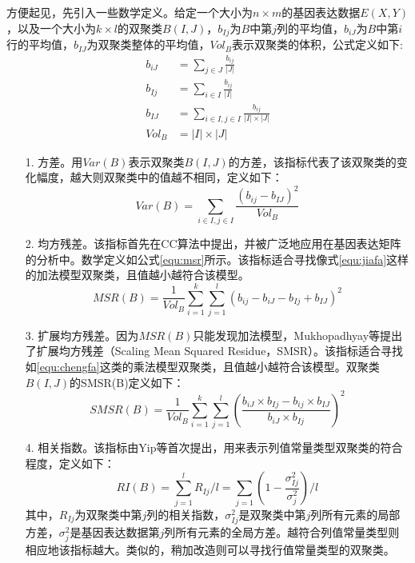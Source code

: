   方便起见，先引入一些数学定义。给定一个大小为$n\times m$的基因表达数据$E(X,Y)$，以及一个大小为$k\times l$的双聚类$B(I,J)$，$b_{Ij}$为$B$中第$j$列的平均值，$b_{iJ}$为$B$中第$i$行的平均值，$b_{IJ}$为双聚类整体的平均值，$Vol_B$表示双聚类的体积，公式定义如下:
  \begin{align}
    b_{iJ} &= \sum_{j\in J}\frac{b_{ij}}{|J|} \\
    b_{Ij} &= \sum_{i\in I}\frac{b_{ij}}{|I|} \\
    b_{IJ} &= \sum_{i\in I,j\in I}\frac{ b_{ij} }{|I| \times |J|}\\
    Vol_B &= |I| \times |J|
  \end{align}
  \begin{enumerate}
    \item[1.] 方差。用$Var(B)$表示双聚类$B(I,J)$的方差，该指标代表了该双聚类的变化幅度，越大则双聚类中的值越不相同，定义如下：
    \begin{equation}
      Var(B) = \sum_{i\in I,j\in I}\frac{(b_{ij}-b_{IJ})^2}{Vol_B}
    \end{equation}

    \item[2.] 均方残差。该指标首先在CC\cite{cc}算法中提出，并被广泛地应用在基因表达矩阵的分析中。数学定义如公式\ref{equ:msr}所示。该指标适合寻找像式\ref{equ:jiafa}这样的加法模型双聚类，且值越小越符合该模型。
    \begin{equation}\label{equ:msr}
      MSR(B) = \frac{1}{Vol_B}\sum_{i=1}^k\sum_{j=1}^l(b_{ij}-b_{iJ}-b_{Ij}+b_{IJ})^2
    \end{equation}

    \item[3.] 扩展均方残差。因为$MSR(B)$只能发现加法模型，Mukhopadhyay\cite{mukhopadhyay2010biclustering}等提出了扩展均方残差（Scaling Mean Squared Residue，SMSR）。该指标适合寻找如\ref{equ:chengfa}这类的乘法模型双聚类，且值越小越符合该模型。双聚类$B(I,J)$的SMSR(B)定义如下：
    \begin{equation}\label{equ:smsr}
      SMSR(B) = \frac{1}{Vol_B}\sum_{i=1}^k\sum_{j=1}^l(\frac{b_{iJ}\times b_{Ij}-b_{ij}\times b_{IJ}}{b_{iJ}\times b_{Ij}})^2
    \end{equation}

    \item[4.] 相关指数。该指标由Yip\cite{yip2004harp}等首次提出，用来表示列值常量类型双聚类的符合程度，定义如下：
    \begin{equation}
      RI(B) = \sum_{j=1}^l R_{Ij}/l = \sum_{j=1}(1 - \frac{\sigma_{Ij}^2}{\sigma_j^2})/l
    \end{equation}
    \hspace{2em} 其中，$R_{Ij}$为双聚类中第$j$列的相关指数，$\sigma_{Ij}^2$是双聚类中第$j$列所有元素的局部方差，$\sigma_{j}^2$是基因表达数据第$j$列所有元素的全局方差。越符合列值常量类型则相应地该指标越大。类似的，稍加改造则可以寻找行值常量类型的双聚类。


\end{enumerate}
